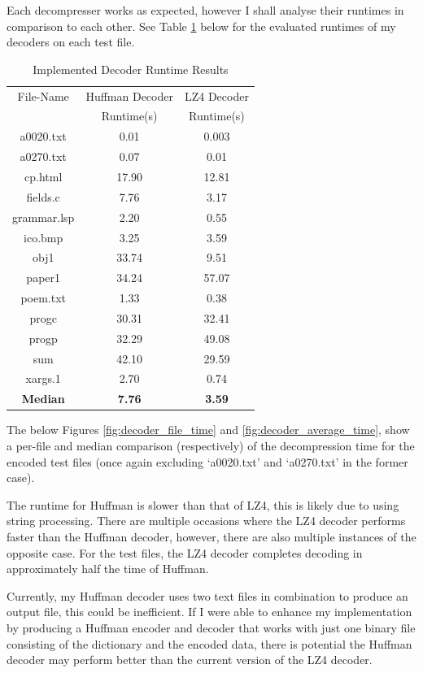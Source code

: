 \documentclass[12pt]{article}
\begin{document}
Each decompresser works as expected, however I shall analyse their runtimes in comparison to each other. See Table \ref{decoder_runtimes} below for the evaluated runtimes of my decoders on each test file.

\begin{table}[H]
	\centering
	\begin{tabular}{| c | c | c |} 
		\hline
		File-Name & Huffman Decoder & LZ4 Decoder\\
		& Runtime(s) & Runtime(s)\\
		\hline
		a0020.txt & 0.01 & 0.003\\
		\hline
		a0270.txt & 0.07 & 0.01\\
		\hline
		cp.html & 17.90 & 12.81\\
		\hline
		fields.c & 7.76 & 3.17\\
		\hline
		grammar.lsp & 2.20 & 0.55\\
		\hline
		ico.bmp & 3.25 & 3.59\\
		\hline
		obj1 & 33.74 & 9.51\\
		\hline
		paper1 & 34.24 & 57.07\\
		\hline
		poem.txt & 1.33 & 0.38\\
		\hline
		progc & 30.31 & 32.41\\
		\hline
		progp & 32.29 & 49.08\\
		\hline
		sum & 42.10 & 29.59\\
		\hline
		xargs.1 & 2.70 & 0.74\\
		\Xhline{3\arrayrulewidth}
		\textbf{Median} & \textbf{7.76} & \textbf{3.59}\\
		\hline
	\end{tabular}
	\caption{Implemented Decoder Runtime Results}
	\label{decoder_runtimes}
\end{table}

The below Figures \ref{fig:decoder_file_time} and \ref{fig:decoder_average_time}, show a per-file and median comparison (respectively) of the decompression time for the encoded test files (once again excluding `a0020.txt' and `a0270.txt' in the former case). 

The runtime for Huffman is slower than that of LZ4, this is likely due to using string processing. There are multiple occasions where the LZ4 decoder performs faster than the Huffman decoder, however, there are also multiple instances of the opposite case. For the test files, the LZ4 decoder completes decoding in approximately half the time of Huffman.

Currently, my Huffman decoder uses two text files in combination to produce an output file, this could be inefficient. If I were able to enhance my implementation by producing a Huffman encoder and decoder that works with just one binary file consisting of the dictionary and the encoded data, there is potential the Huffman decoder may perform better than the current version of the LZ4 decoder.
\end{document}
